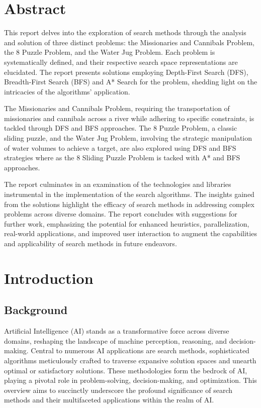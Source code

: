 \documentclass[12pt]{article}
\begin{document}
\section*{Abstract}
\thispagestyle{empty}
This report delves into the exploration of search methods through the analysis and solution of three distinct problems: the Missionaries and Cannibals Problem, the 8 Puzzle Problem, and the Water Jug Problem. Each problem is systematically defined, and their respective search space representations are elucidated. The report presents solutions employing Depth-First Search (DFS), Breadth-First Search (BFS) and A* Search for the problem, shedding light on the intricacies of the algorithms' application.

The Missionaries and Cannibals Problem, requiring the transportation of missionaries and cannibals across a river while adhering to specific constraints, is tackled through DFS and BFS approaches. The 8 Puzzle Problem, a classic sliding puzzle, and the Water Jug Problem, involving the strategic manipulation of water volumes to achieve a target, are also explored using DFS and BFS strategies where as the 8 Sliding Puzzle Problem is tacked with A* and BFS approaches.

The report culminates in an examination of the technologies and libraries instrumental in the implementation of the search algorithms. The insights gained from the solutions highlight the efficacy of search methods in addressing complex problems across diverse domains. The report concludes with suggestions for further work, emphasizing the potential for enhanced heuristics, parallelization, real-world applications, and improved user interaction to augment the capabilities and applicability of search methods in future endeavors.




\clearpage
\thispagestyle{empty}
\tableofcontents

\clearpage
\thispagestyle{empty}
\listoffigures
\clearpage

\section{Introduction}
\subsection{Background}

Artificial Intelligence (AI) stands as a transformative force across diverse domains, reshaping the landscape of machine 
perception, reasoning, and decision-making. Central to numerous AI applications are search methods, sophisticated 
algorithms meticulously crafted to traverse expansive solution spaces and unearth optimal or satisfactory solutions. 
These methodologies form the bedrock of AI, playing a pivotal role in problem-solving, decision-making, and optimization. 
This overview aims to succinctly underscore the profound significance of search methods and their multifaceted applications 
within the realm of AI.
\end{document}
